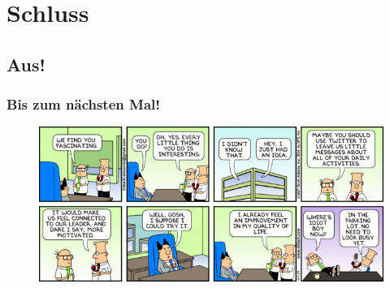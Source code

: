 \section{Schluss}
\subsection{Aus!}
\begin{frame}
\frametitle{Bis zum nächsten Mal!}
	\begin{figure}[H]
		\includegraphics[width= \textwidth]{images/dilbert-69231}
	\end{figure}
\end{frame}


